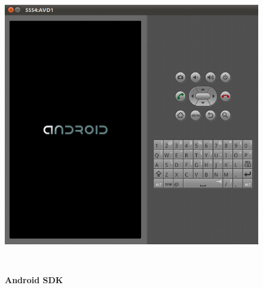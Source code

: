 \begin{figure}[H]
  \centering
    \includegraphics[height= 13cm, width=15cm]{project/images/android-sdk}
  \caption{\textbf{Android SDK}}
\end{figure}

